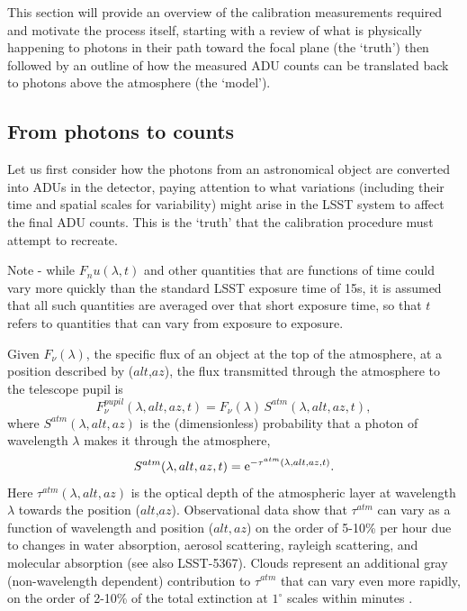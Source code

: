 \documentclass[12pt,preprint]{aastex}
\begin{document}
This section will provide an overview of the calibration measurements
required and motivate the process itself, starting with a review of
what is physically happening to photons in their path toward the focal
plane (the `truth') then followed by an outline of how the measured
ADU counts can be translated back to photons above the atmosphere (the
`model').

\subsection{From photons to counts}

Let us first consider how the photons from an astronomical object are
converted into ADUs in the detector, paying attention to what
variations (including their time and spatial scales for variability)
might arise in the LSST system to affect the final ADU counts. This is
the `truth' that the calibration procedure must attempt to recreate. 

Note - while $F_nu(\lambda,t)$ and other quantities that are functions of time
could vary more quickly than the standard LSST exposure time of 15s, it is
assumed that all such quantities are averaged over that short exposure time, so 
that $t$ refers to quantities that can vary from exposure to exposure. 

Given $F_\nu(\lambda)$, the specific flux of an object at
the top of the atmosphere, at a position described by ($alt$,$az$),
the flux transmitted through the atmosphere to the telescope pupil is
\begin{equation}
\label{eqn:Fpupil}
   F_\nu^{pupil}(\lambda,alt,az,t) = F_\nu(\lambda) \, S^{atm}(\lambda,alt,az,t),
\end{equation}
where $S^{atm}(\lambda,alt,az)$ is the (dimensionless) probability that a photon of 
wavelength $\lambda$ makes it through the atmosphere,
\begin{equation}
\label{eqn:atmTau}
   S^{atm}(\lambda,alt,az,t)   = {\rm e}^{-\tau^{atm}(\lambda,alt,az,t)}.
\end{equation}
Here $\tau^{atm}(\lambda,alt,az)$ is the optical depth of the
atmospheric layer at wavelength $\lambda$ towards the position
($alt$,$az$). Observational data \citep{Stubbs2007b, Burke2010b} show
that $\tau^{atm}$ can vary as a function of wavelength and position
($alt,az$) on the order of 5-10\% per hour due to changes in water
absorption, aerosol scattering, rayleigh scattering, and molecular
absorption (see also LSST-5367). Clouds represent an additional gray
(non-wavelength dependent) contribution to $\tau^{atm}$ that can vary
even more rapidly, on the order of 2-10\% of the total extinction at
$1^{\circ}$ scales within minutes \citep{Ivezic2007}.
\end{document}
